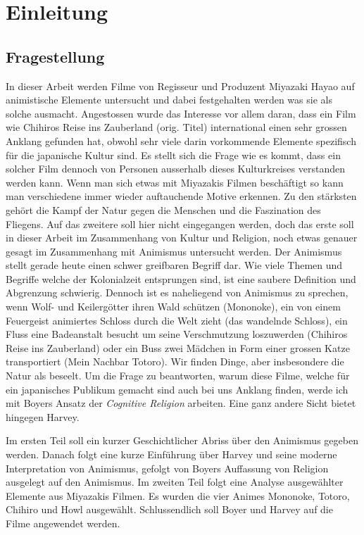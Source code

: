 \section{Einleitung}
\subsection{Fragestellung}
In dieser Arbeit werden Filme von Regisseur und Produzent Miyazaki Hayao auf animistische Elemente untersucht und dabei festgehalten werden was sie als solche ausmacht.
Angestossen wurde das Interesse vor allem daran, dass ein Film wie Chihiros Reise ins Zauberland (orig. Titel) international einen sehr grossen Anklang gefunden hat, obwohl sehr viele darin vorkommende Elemente spezifisch für die japanische Kultur sind. Es stellt sich die Frage wie es kommt, dass ein solcher Film dennoch von Personen ausserhalb dieses Kulturkreises verstanden werden kann. Wenn man sich etwas mit Miyazakis Filmen beschäftigt so kann man verschiedene immer wieder auftauchende Motive erkennen. Zu den stärksten gehört die Kampf der Natur gegen die Menschen und die Faszination des Fliegens. Auf das zweitere soll hier nicht eingegangen werden, doch das erste soll in dieser Arbeit im Zusammenhang von Kultur und Religion, noch etwas genauer gesagt im Zusammenhang mit Animismus untersucht werden. Der Animismus stellt gerade heute einen schwer greifbaren Begriff dar. Wie viele Themen und Begriffe welche der Kolonialzeit entsprungen sind, ist eine saubere Definition und Abgrenzung schwierig. Dennoch ist es naheliegend von Animismus zu sprechen, wenn Wolf- und Keilergötter ihren Wald schützen (Mononoke), ein von einem Feuergeist animiertes Schloss durch die Welt zieht (das wandelnde Schloss), ein Fluss eine Badeanstalt besucht um seine Verschmutzung loszuwerden (Chihiros Reise ins Zauberland) oder ein Buss zwei Mädchen in Form einer grossen Katze transportiert (Mein Nachbar Totoro). Wir finden Dinge, aber insbesondere die Natur als beseelt. Um die Frage zu beantworten, warum diese Filme, welche für ein japanisches Publikum gemacht sind auch bei uns Anklang finden, werde ich mit Boyers Ansatz der \emph{Cognitive Religion} arbeiten. Eine ganz andere Sicht bietet hingegen Harvey.

Im ersten Teil soll ein kurzer Geschichtlicher Abriss über den Animismus gegeben werden. Danach folgt eine kurze Einführung über Harvey und seine moderne Interpretation von Animismus, gefolgt von Boyers Auffassung von Religion ausgelegt auf den Animismus. Im zweiten Teil folgt eine Analyse ausgewählter Elemente aus Miyazakis Filmen. Es wurden die vier Animes Mononoke, Totoro, Chihiro und Howl ausgewählt. Schlussendlich soll Boyer und Harvey auf die Filme angewendet werden.